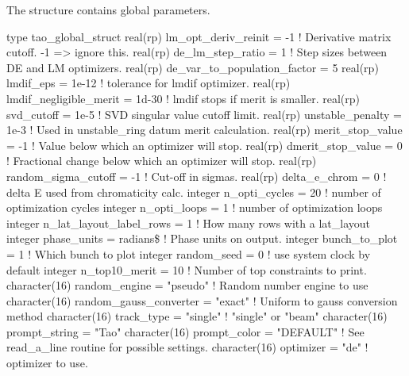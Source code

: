 {{{{{{{The  structure contains \tao global parameters.
\begin{example}
type tao_global_struct
  real(rp) lm_opt_deriv_reinit = -1   ! Derivative matrix cutoff. -1 => ignore this.
  real(rp) de_lm_step_ratio = 1       ! Step sizes between DE and LM optimizers.
  real(rp) de_var_to_population_factor = 5 
  real(rp) lmdif_eps = 1e-12          ! tolerance for lmdif optimizer.
  real(rp) lmdif_negligible_merit = 1d-30  ! lmdif stops if merit is smaller.
  real(rp) svd_cutoff = 1e-5          ! SVD singular value cutoff limit.
  real(rp) unstable_penalty = 1e-3    ! Used in unstable_ring datum merit calculation.
  real(rp) merit_stop_value = -1      ! Value below which an optimizer will stop.
  real(rp) dmerit_stop_value = 0      ! Fractional change below which an optimizer will stop.
  real(rp) random_sigma_cutoff = -1   ! Cut-off in sigmas.
  real(rp) delta_e_chrom = 0          ! delta E used from chromaticity calc.
  integer n_opti_cycles = 20          ! number of optimization cycles
  integer n_opti_loops = 1            ! number of optimization loops
  integer n_lat_layout_label_rows = 1 ! How many rows with a lat_layout
  integer phase_units = radians\$      ! Phase units on output.
  integer bunch_to_plot = 1           ! Which bunch to plot
  integer random_seed = 0             ! use system clock by default
  integer n_top10_merit = 10          ! Number of top constraints to print.
  character(16)  random_engine = "pseudo"         ! Random number engine to use
  character(16)  random_gauss_converter = "exact" ! Uniform to gauss conversion method
  character(16)  track_type = "single"            ! "single" or "beam" 
  character(16)  prompt_string = "Tao"
  character(16)  prompt_color = "DEFAULT"         ! See read_a_line routine for possible settings.
  character(16)  optimizer     = "de"             ! optimizer to use.

\end{example}}}}}}}}
